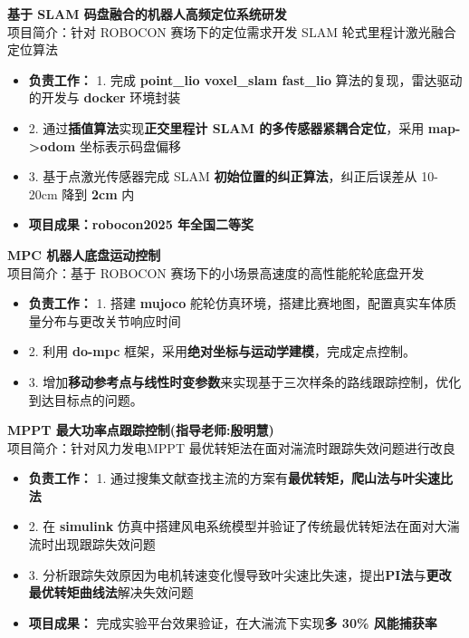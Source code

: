 \documentclass[11pt, a4paper]{article}
\begin{document}
\textbf{基于 SLAM 码盘融合的机器人高频定位系统研发} \hfill {}  \\
{\kaishu 项目简介：针对 ROBOCON 赛场下的定位需求开发 SLAM 轮式里程计激光融合定位算法} %
\begin{itemize}[leftmargin=1.5em, noitemsep, topsep=2pt]
    \item \textbf{负责工作：} 1. 完成 \textbf{point\_lio voxel\_slam fast\_lio} 算法的复现，雷达驱动的开发与 \textbf{docker} 环境封装
    \item 2. 通过\textbf{插值算法}实现\textbf{正交里程计 SLAM 的多传感器紧耦合定位}，采用 \textbf{map->odom} 坐标表示码盘偏移
    \item 3. 基于点激光传感器完成 SLAM \textbf{初始位置的纠正算法}，纠正后误差从 10-20cm 降到 \textbf{2cm} 内
    \item \textbf{项目成果：robocon2025 年全国二等奖}
\end{itemize}

\vspace{4pt}
\textbf{MPC 机器人底盘运动控制} \hfill {}  \\
{\kaishu 项目简介：基于 ROBOCON 赛场下的小场景高速度的高性能舵轮底盘开发}
\begin{itemize}[leftmargin=1.5em, noitemsep, topsep=2pt]
    \item \textbf{负责工作：} 1. 搭建 \textbf{mujoco} 舵轮仿真环境，搭建比赛地图，配置真实车体质量分布与更改关节响应时间
    \item 2. 利用 \textbf{do-mpc} 框架，采用\textbf{绝对坐标与运动学建模}，完成定点控制。
    \item 3. 增加\textbf{移动参考点与线性时变参数}来实现基于三次样条的路线跟踪控制，优化到达目标点的问题。
\end{itemize}

\vspace{4pt}
\textbf{MPPT 最大功率点跟踪控制(指导老师:殷明慧)} \hfill {}  \\
{\kaishu 项目简介：针对风力发电MPPT 最优转矩法在面对湍流时跟踪失效问题进行改良}
\begin{itemize}[leftmargin=1.5em, noitemsep, topsep=2pt]
    \item \textbf{负责工作：} 1. 通过搜集文献查找主流的方案有\textbf{最优转矩，爬山法与叶尖速比法}
    \item 2. 在 \textbf{simulink} 仿真中搭建风电系统模型并验证了传统最优转矩法在面对大湍流时出现跟踪失效问题
    \item 3. 分析跟踪失效原因为电机转速变化慢导致叶尖速比失速，提出\textbf{PI法}与\textbf{更改最优转矩曲线法}解决失效问题
    \item \textbf{项目成果：} 完成实验平台效果验证，在大湍流下实现\textbf{多 30\% 风能捕获率}
\end{itemize}
\end{document}
